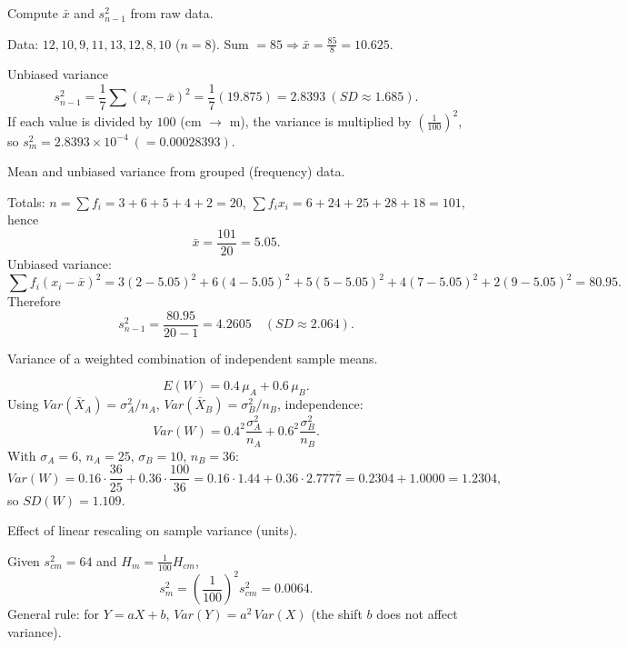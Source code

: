 \documentclass[11pt]{article}
\def\textbf#1{#1}%
\def\mathbb#1{#1}%
\def\mathrm#1{#1}%
\begin{document}
\begin{solution}
\textbf{Compute $\bar x$ and $s^2_{n-1}$ from raw data.}

Data: $12,10,9,11,13,12,8,10$ ($n=8$).  
Sum $=85\Rightarrow \bar x=\frac{85}{8}=\boxed{10.625}$.

Unbiased variance
\[
s^2_{n-1}=\frac{1}{7}\sum (x_i-\bar x)^2
=\frac{1}{7}(19.875)=\boxed{2.8393}\ (\mathrm{SD}\approx \boxed{1.685}).
\]
If each value is divided by $100$ (cm $\to$ m), the variance is multiplied by $(\tfrac{1}{100})^2$, so
$s^2_{m}=\boxed{2.8393\times 10^{-4}}\ (=0.00028393)$.
\end{solution}

\begin{solution}
\textbf{Mean and unbiased variance from grouped (frequency) data.}

Totals: $n=\sum f_i=3+6+5+4+2=\boxed{20}$,  
$\sum f_ix_i=6+24+25+28+18=\boxed{101}$, hence
\[
\bar x=\frac{101}{20}=\boxed{5.05}.
\]
Unbiased variance:
\[
\sum f_i(x_i-\bar x)^2
=3(2-5.05)^2+6(4-5.05)^2+5(5-5.05)^2+4(7-5.05)^2+2(9-5.05)^2
=\boxed{80.95}.
\]
Therefore
\[
s^2_{n-1}=\frac{80.95}{20-1}=\boxed{4.2605}\quad(\mathrm{SD}\approx 2.064).
\]
\end{solution}

\begin{solution}
\textbf{Variance of a weighted combination of independent sample means.}

\[
\mathbb E(W)=0.4\,\mu_A+0.6\,\mu_B.
\]
Using $\mathrm{Var}(\bar X_A)=\sigma_A^2/n_A$, $\mathrm{Var}(\bar X_B)=\sigma_B^2/n_B$, independence:
\[
\mathrm{Var}(W)=0.4^2\frac{\sigma_A^2}{n_A}+0.6^2\frac{\sigma_B^2}{n_B}.
\]
With $\sigma_A=6$, $n_A=25$, $\sigma_B=10$, $n_B=36$:
\[
\mathrm{Var}(W)=0.16\cdot\frac{36}{25}+0.36\cdot\frac{100}{36}
=0.16\cdot1.44+0.36\cdot2.777\overline7
=0.2304+1.0000=\boxed{1.2304},
\]
so $\mathrm{SD}(W)=\boxed{1.109}$.
\end{solution}

\begin{solution}
\textbf{Effect of linear rescaling on sample variance (units).}

Given $s^2_{cm}=64$ and $H_m=\tfrac{1}{100}H_{cm}$,
\[
s^2_m=\left(\frac{1}{100}\right)^2 s^2_{cm}=\boxed{0.0064}.
\]
General rule: for $Y=aX+b$, $\mathrm{Var}(Y)=a^2\,\mathrm{Var}(X)$ (the shift $b$ does not affect variance).
\end{solution}

\end{document}

